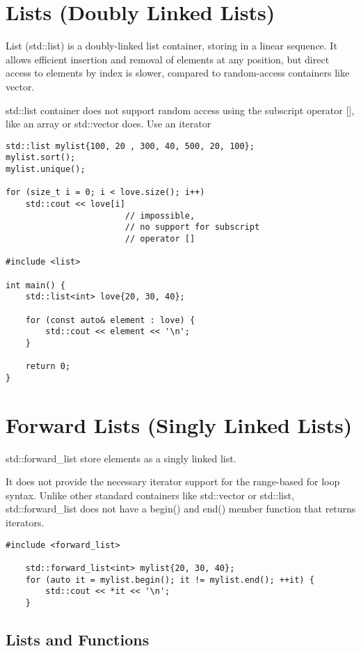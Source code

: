 \section{Lists (Doubly Linked Lists)}

List (std::list) is a doubly-linked list container, storing in a linear sequence. 
It allows efficient insertion and removal of elements at any position, 
but direct access to elements by index is slower,
compared to random-access containers like vector.

std::list container does not support random access using the subscript operator [],
like an array or std::vector does. Use an iterator

\begin{verbatim}
std::list mylist{100, 20 , 300, 40, 500, 20, 100};
mylist.sort();
mylist.unique();

for (size_t i = 0; i < love.size(); i++)
    std::cout << love[i] 
                        // impossible, 
                        // no support for subscript
                        // operator []

#include <list>

int main() {
    std::list<int> love{20, 30, 40};

    for (const auto& element : love) {
        std::cout << element << '\n';
    }

    return 0;
}
\end{verbatim}

\section{Forward Lists (Singly Linked Lists)}

std::forward\_list store elements as a singly linked list.

It does not provide the necessary iterator support for the range-based for loop syntax.
Unlike other standard containers like std::vector or std::list,
std::forward\_list does not have a begin() and end() member function that returns iterators.

\begin{verbatim}
#include <forward_list>

    std::forward_list<int> mylist{20, 30, 40};
    for (auto it = mylist.begin(); it != mylist.end(); ++it) {
        std::cout << *it << '\n';
    }
\end{verbatim}

\subsection{Lists and Functions}


